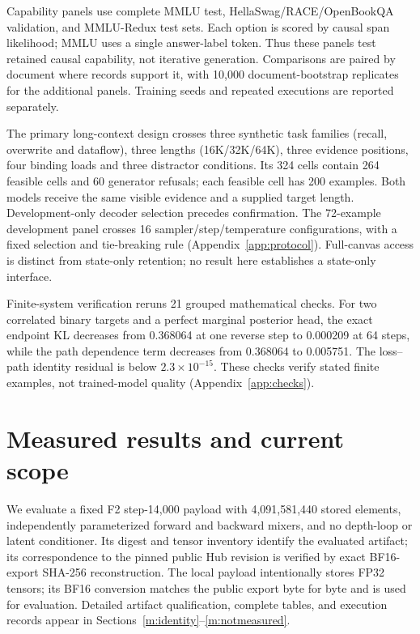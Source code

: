 \documentclass{article}
\theoremstyle{remark}\newtheorem{remark}[theorem]{Remark}
\begin{document}
Capability panels use complete MMLU test, HellaSwag/RACE/OpenBookQA validation, and MMLU-Redux test sets. Each option is scored by causal span likelihood; MMLU uses a single answer-label token. Thus these panels test retained causal capability, not iterative generation. Comparisons are paired by document where records support it, with 10,000 document-bootstrap replicates for the additional panels. Training seeds and repeated executions are reported separately.

The primary long-context design crosses three synthetic task families (recall, overwrite and dataflow), three lengths (16K/32K/64K), three evidence positions, four binding loads and three distractor conditions. Its 324 cells contain 264 feasible cells and 60 generator refusals; each feasible cell has 200 examples. Both models receive the same visible evidence and a supplied target length. Development-only decoder selection precedes confirmation. The 72-example development panel crosses 16 sampler/step/temperature configurations, with a fixed selection and tie-breaking rule (Appendix~\ref{app:protocol}). Full-canvas access is distinct from state-only retention; no result here establishes a state-only interface.

Finite-system verification reruns 21 grouped mathematical checks. For two correlated binary targets and a perfect marginal posterior head, the exact endpoint KL decreases from 0.368064 at one reverse step to 0.000209 at 64 steps, while the path dependence term decreases from 0.368064 to 0.005751. The loss--path identity residual is below $2.3\times10^{-15}$. These checks verify stated finite examples, not trained-model quality (Appendix~\ref{app:checks}).

\section{Measured results and current scope}
\label{m:results-summary}

We evaluate a fixed F2 step-14,000 payload with 4,091,581,440 stored elements,
independently parameterized forward and backward mixers, and no depth-loop or latent
conditioner. Its digest and tensor inventory identify the evaluated artifact; its
correspondence to the pinned public Hub revision is verified by exact BF16-export
SHA-256 reconstruction. The local payload intentionally stores FP32 tensors; its
BF16 conversion matches the public export byte for byte and is used for evaluation. Detailed artifact qualification, complete tables,
and execution records appear in Sections~\ref{m:identity}--\ref{m:notmeasured}.
\end{document}
